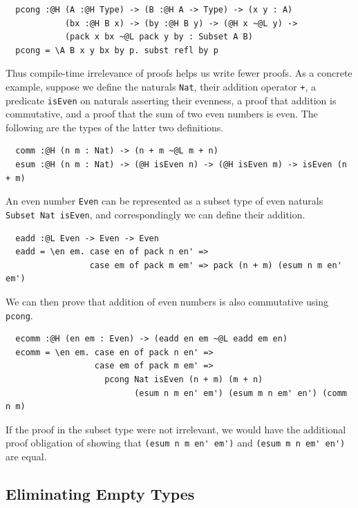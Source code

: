 \documentclass[acmsmall]{acmart}
\theoremstyle{linked}
\theoremstyle{deflinked}
\theoremstyle{acmdefinition}
\begin{document}
\begin{lstlisting}
  pcong :@H (A :@H Type) -> (B :@H A -> Type) -> (x y : A)
            (bx :@H B x) -> (by :@H B y) -> (@H x ~@L y) ->
            (pack x bx ~@L pack y by : Subset A B)
  pcong = \A B x y bx by p. subst refl by p
\end{lstlisting}

Thus compile-time irrelevance of proofs helps us write fewer proofs.
As a concrete example, suppose we define the naturals \lstinline{Nat},
their addition operator \lstinline{+},
a predicate \lstinline{isEven} on naturals asserting their evenness,
a proof that addition is commutative,
and a proof that the sum of two even numbers is even.
The following are the types of the latter two definitions.

\begin{lstlisting}
  comm :@H (n m : Nat) -> (n + m ~@L m + n)
  esum :@H (n m : Nat) -> (@H isEven n) -> (@H isEven m) -> isEven (n + m)
\end{lstlisting}

An even number \lstinline{Even} can be represented
as a subset type of even naturals \lstinline{Subset Nat isEven},
and correspondingly we can define their addition.

\begin{lstlisting}
  eadd :@L Even -> Even -> Even
  eadd = \en em. case en of pack n en' =>
                 case em of pack m em' => pack (n + m) (esum n m en' em')
\end{lstlisting}

We can then prove that addition of even numbers is also commutative using \lstinline{pcong}.

\begin{lstlisting}
  ecomm :@H (en em : Even) -> (eadd en em ~@L eadd em en)
  ecomm = \en em. case en of pack n en' =>
                  case em of pack m em' =>
                    pcong Nat isEven (n + m) (m + n)
                          (esum n m en' em') (esum m n em' en') (comm n m)
\end{lstlisting}

If the proof in the subset type were not irrelevant,
we would have the additional proof obligation of showing that
\lstinline{(esum n m en' em')} and
\lstinline{(esum m n em' en')} are equal.

\subsection{Eliminating Empty Types}
\end{document}
